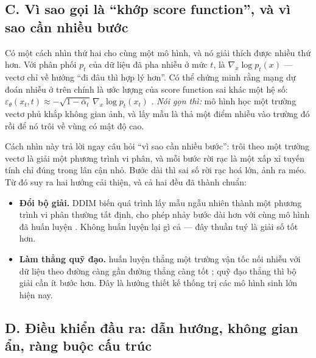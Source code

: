\documentclass[../../../deep_learning.tex]{subfiles}
\begin{document}
\subsection{C. Vì sao gọi là ``khớp score function'', và vì sao cần nhiều bước}
Có một cách nhìn thứ hai cho cùng một mô hình, và nó giải thích được nhiều thứ hơn. Với phân phối \(p_t\) của dữ liệu đã pha nhiễu ở mức \(t\),  là \(\nabla_x \log p_t(x)\) --- vectơ chỉ về hướng ``đi đâu thì hợp lý hơn''. Có thể chứng minh rằng mạng dự đoán nhiễu ở trên chính là ước lượng của score function sai khác một hệ số: \(\varepsilon_\theta(x_t,t)\approx -\sqrt{1-\bar\alpha_t}\,\nabla_x\log p_t(x_t)\) \cite{song2021score}. \emph{Nói gọn thì:} mô hình học một trường vectơ phủ khắp không gian ảnh, và lấy mẫu là thả một điểm nhiễu vào trường đó rồi để nó trôi về vùng có mật độ cao.

Cách nhìn này trả lời ngay câu hỏi ``vì sao cần nhiều bước'': trôi theo một trường vectơ là giải một phương trình vi phân, và mỗi bước rời rạc là một xấp xỉ tuyến tính chỉ đúng trong lân cận nhỏ. Bước dài thì sai số rời rạc hoá lớn, ảnh ra méo. Từ đó suy ra hai hướng cải thiện, và cả hai đều đã thành chuẩn:
\begin{itemize}
\item \textbf{Đổi bộ giải.} DDIM biến quá trình lấy mẫu ngẫu nhiên thành một phương trình vi phân thường tất định, cho phép nhảy bước dài hơn với cùng mô hình đã huấn luyện \cite{song2021ddim}. Không huấn luyện lại gì cả --- đây thuần tuý là giải số tốt hơn.
\item \textbf{Làm thẳng quỹ đạo.}  huấn luyện thẳng một trường vận tốc nối nhiễu với dữ liệu theo đường càng gần đường thẳng càng tốt \cite{lipman2023flow}; quỹ đạo thẳng thì bộ giải cần ít bước hơn. Đây là hướng thiết kế thống trị các mô hình sinh lớn hiện nay.
\end{itemize}

\subsection{D. Điều khiển đầu ra: dẫn hướng, không gian ẩn, ràng buộc cấu trúc}
\end{document}

